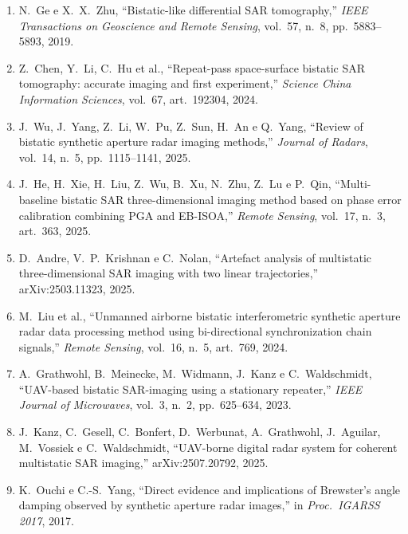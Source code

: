 \documentclass[12pt,a4paper,oneside]{book}
\theoremstyle{remark}
\theoremstyle{plain}
\theoremstyle{definition}
\begin{document}
\begin{enumerate}
  \item \label{ref:ge2019}
  N.\ Ge e X.\ X.\ Zhu, ``Bistatic-like differential SAR tomography,''
  \textit{IEEE Transactions on Geoscience and Remote Sensing}, vol.\ 57,
  n.\ 8, pp.\ 5883--5893, 2019.

  \item \label{ref:chenz2024}
  Z.\ Chen, Y.\ Li, C.\ Hu et al., ``Repeat-pass space-surface bistatic SAR
  tomography: accurate imaging and first experiment,'' \textit{Science
  China Information Sciences}, vol.\ 67, art.\ 192304, 2024.

  \item \label{ref:wu2025}
  J.\ Wu, J.\ Yang, Z.\ Li, W.\ Pu, Z.\ Sun, H.\ An e Q.\ Yang, ``Review of
  bistatic synthetic aperture radar imaging methods,'' \textit{Journal of
  Radars}, vol.\ 14, n.\ 5, pp.\ 1115--1141, 2025.

  \item \label{ref:he2025}
  J.\ He, H.\ Xie, H.\ Liu, Z.\ Wu, B.\ Xu, N.\ Zhu, Z.\ Lu e P.\ Qin,
  ``Multi-baseline bistatic SAR three-dimensional imaging method based on
  phase error calibration combining PGA and EB-ISOA,'' \textit{Remote
  Sensing}, vol.\ 17, n.\ 3, art.\ 363, 2025.

  \item \label{ref:andre2025}
  D.\ Andre, V.\ P.\ Krishnan e C.\ Nolan, ``Artefact analysis of
  multistatic three-dimensional SAR imaging with two linear
  trajectories,'' arXiv:2503.11323, 2025.

  \item \label{ref:liu2024}
  M.\ Liu et al., ``Unmanned airborne bistatic interferometric synthetic
  aperture radar data processing method using bi-directional
  synchronization chain signals,'' \textit{Remote Sensing}, vol.\ 16, n.\ 5,
  art.\ 769, 2024.

  \item \label{ref:grathwohl2023}
  A.\ Grathwohl, B.\ Meinecke, M.\ Widmann, J.\ Kanz e C.\ Waldschmidt,
  ``UAV-based bistatic SAR-imaging using a stationary repeater,''
  \textit{IEEE Journal of Microwaves}, vol.\ 3, n.\ 2, pp.\ 625--634, 2023.

  \item \label{ref:kanz2025}
  J.\ Kanz, C.\ Gesell, C.\ Bonfert, D.\ Werbunat, A.\ Grathwohl,
  J.\ Aguilar, M.\ Vossiek e C.\ Waldschmidt, ``UAV-borne digital radar
  system for coherent multistatic SAR imaging,'' arXiv:2507.20792, 2025.

  \item \label{ref:ouchi2017}
  K.\ Ouchi e C.-S.\ Yang, ``Direct evidence and implications of Brewster's
  angle damping observed by synthetic aperture radar images,'' in
  \textit{Proc.\ IGARSS 2017}, 2017.


\end{enumerate}
\end{document}
